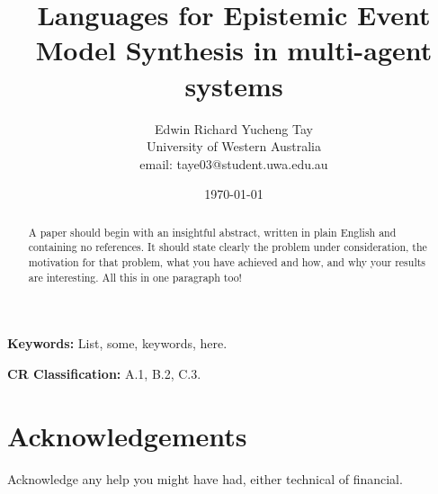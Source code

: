 \documentclass[12pt,a4paper]{article}
\title{Languages for Epistemic Event Model Synthesis in multi-agent systems}
\author{Edwin Richard Yucheng Tay \\
University of Western Australia \\
email: taye03@student.uwa.edu.au }
\date{\today}
\begin{document}
\maketitle

\begin{abstract}

A paper should begin with an insightful abstract, written in plain
English and containing no references. It should state clearly the
problem under consideration, the motivation for that problem, what you
have achieved and how, and why your results are interesting.  All this
in one paragraph too!

\end{abstract}

{\bf Keywords:} List, some, keywords, here.

{\bf CR Classification:} A.1, B.2, C.3.






\section*{Acknowledgements}

Acknowledge any help you might have had, either technical of financial.



\end{document}
